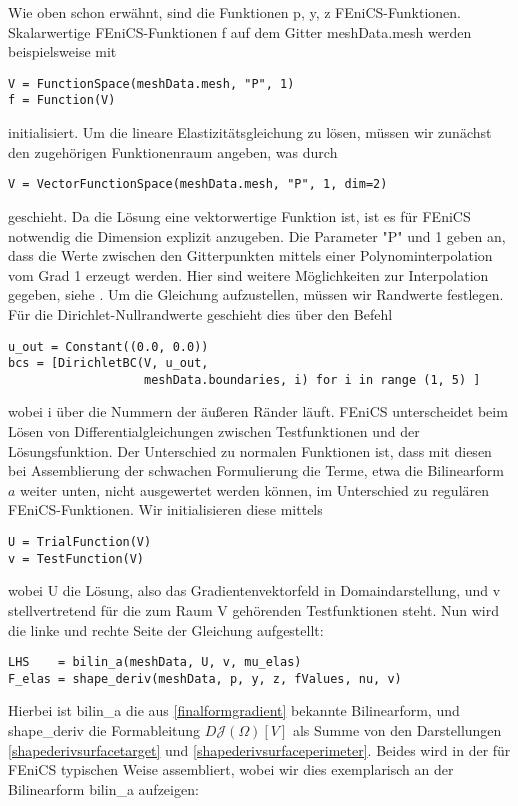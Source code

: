Wie oben schon erwähnt, sind die Funktionen \textsf{p, y, z} FEniCS-Funktionen. 
Skalarwertige FEniCS-Funktionen \textsf{f} auf dem Gitter \textsf{meshData.mesh} werden beispielsweise mit
\begin{lstlisting}
V = FunctionSpace(meshData.mesh, "P", 1)
f = Function(V)
\end{lstlisting}
initialisiert. Um die lineare Elastizitätsgleichung zu lösen, müssen wir zunächst den zugehörigen Funktionenraum angeben, was durch
\begin{lstlisting}
V = VectorFunctionSpace(meshData.mesh, "P", 1, dim=2)
\end{lstlisting}
geschieht. Da die Lösung eine vektorwertige Funktion ist, ist es für FEniCS notwendig die Dimension explizit anzugeben. Die Parameter \textsf{"P"} und \textsf{1} geben an, dass die Werte zwischen den Gitterpunkten mittels einer Polynominterpolation vom Grad 1 erzeugt werden. Hier sind weitere Möglichkeiten zur Interpolation gegeben, siehe \cite{fenics}. Um die Gleichung aufzustellen, müssen wir Randwerte festlegen. Für die Dirichlet-Nullrandwerte geschieht dies über den Befehl
\begin{lstlisting}
u_out = Constant((0.0, 0.0))
bcs = [DirichletBC(V, u_out, 
                   meshData.boundaries, i) for i in range (1, 5) ]
\end{lstlisting}
wobei \textsf{i} über die Nummern der äußeren Ränder läuft. FEniCS unterscheidet beim Lösen von Differentialgleichungen zwischen Testfunktionen und der Lösungsfunktion. Der Unterschied zu normalen Funktionen ist, dass mit diesen bei Assemblierung der schwachen Formulierung die Terme, etwa die Bilinearform $a$ weiter unten, nicht ausgewertet werden können, im Unterschied zu regulären FEniCS-Funktionen. Wir initialisieren diese mittels
\begin{lstlisting}
U = TrialFunction(V)
v = TestFunction(V)
\end{lstlisting}
wobei \textsf{U} die Lösung, also das Gradientenvektorfeld in Domaindarstellung, und \textsf{v} stellvertretend für die zum Raum \textsf{V} gehörenden Testfunktionen steht. Nun wird die linke und rechte Seite der Gleichung aufgestellt:
\begin{lstlisting}
LHS    = bilin_a(meshData, U, v, mu_elas)
F_elas = shape_deriv(meshData, p, y, z, fValues, nu, v)
\end{lstlisting}
Hierbei ist \textsf{bilin\_a} die aus \ref{finalformgradient} bekannte Bilinearform, und \textsf{shape\_deriv} die Formableitung $D\mathcal{J}(\Omega)[V]$ als Summe von den Darstellungen \ref{shapederivsurfacetarget} und \ref{shapederivsurfaceperimeter}. Beides wird in der für FEniCS typischen Weise assembliert, wobei wir dies exemplarisch an der Bilinearform \textsf{bilin\_a} aufzeigen: \label{bilina}
